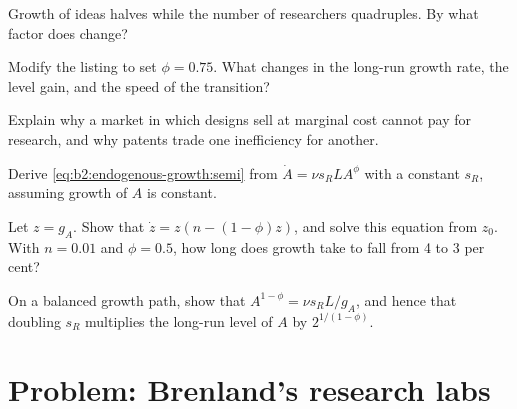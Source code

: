 \begin{exercise}[$\star\star$]\label{exo:b2:endogenous-growth:7}
Growth of ideas halves while the number of researchers quadruples. By what factor does  change?
\end{exercise}

\begin{exercise}[$\star\star$]\label{exo:b2:endogenous-growth:8}
Modify the listing to set $\phi = 0.75$. What changes in the long-run growth rate, the level gain, and the speed of the transition?
\end{exercise}

\begin{exercise}[$\star\star$]\label{exo:b2:endogenous-growth:9}
Explain why a market in which designs sell at marginal cost cannot pay for research, and why patents trade one inefficiency
for another.
\end{exercise}

\begin{exercise}[$\star\star\star$]\label{exo:b2:endogenous-growth:10}
Derive \eqref{eq:b2:endogenous-growth:semi} from $\dot A = \nu s_RLA^\phi$ with a constant $s_R$, assuming growth of $A$ is constant.
\end{exercise}

\begin{exercise}[$\star\star\star$]\label{exo:b2:endogenous-growth:11}
Let $z = g_A$. Show that $\dot z = z(n - (1 - \phi)z)$, and solve this equation from $z_0$. With $n = 0.01$ and $\phi = 0.5$, how long does growth take to fall from 4 to 3 per cent?
\end{exercise}

\begin{exercise}[$\star\star\star$]\label{exo:b2:endogenous-growth:12}
On a balanced growth path, show that $A^{1-\phi} = \nu s_RL/g_A$, and hence that doubling $s_R$ multiplies the long-run level of $A$ by $2^{1/(1-\phi)}$.
\end{exercise}

\section{Problem: Brenland's research labs}\label{sec:b2:endogenous-growth:problem}

